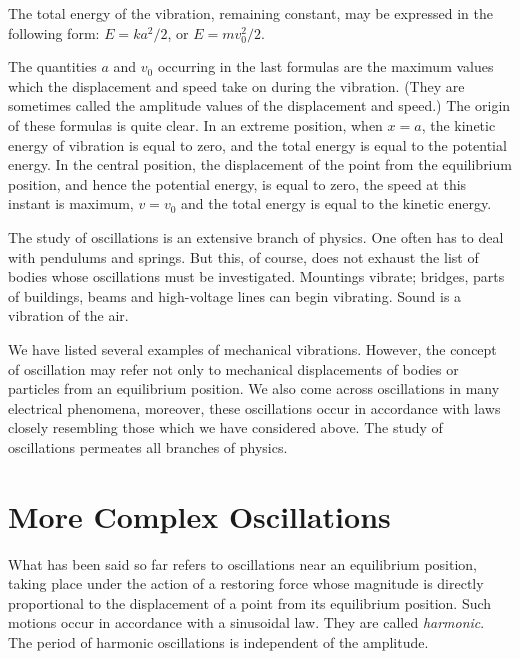 The total energy of the vibration, remaining constant,
may be expressed in the following form: $E = ka^{2}/2$, or
$E = mv_{0}^{2}/2$.

The quantities $a$ and $v_{0}$ occurring in the last formulas
are the maximum values which the displacement and
speed take on during the vibration. (They are sometimes
called the amplitude values of the displacement and
speed.) The origin of these formulas is quite clear. In
an extreme position, when $x = a$, the kinetic energy of
vibration is equal to zero, and the total energy is equal to
the potential energy. In the central position, the displacement of the point from the equilibrium position, and hence the potential energy, is equal to zero, the speed at this instant is maximum, $v = v_{0}$ and the total energy is equal to the kinetic energy.

The study of oscillations is an extensive branch of
physics. One often has to deal with pendulums and
springs. But this, of course, does not exhaust the list of
bodies whose oscillations must be investigated. Mountings
vibrate; bridges, parts of buildings, beams and high-voltage lines can begin vibrating. Sound is a vibration of the air.

We have listed several examples of mechanical vibrations. However, the concept of oscillation may refer not only to mechanical displacements of bodies or particles from an equilibrium position. We also come across oscillations in many electrical phenomena, moreover, these
oscillations occur in accordance with laws closely resembling those which we have considered above. The study of oscillations permeates all branches of physics.

\section{More Complex Oscillations}

What has been said so far refers to oscillations near an
equilibrium position, taking place under the action of a
restoring force whose magnitude is directly proportional
to the displacement of a point from its equilibrium position. Such motions occur in accordance with a sinusoidal
law. They are called \emph{harmonic}. The period of harmonic
oscillations is independent of the amplitude.

